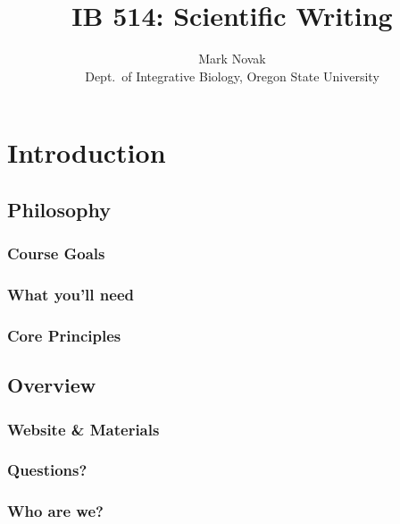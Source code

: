 \documentclass[12pt]{article}
\title{\textbf{IB 514: Scientific Writing}}
\author{Mark Novak \\
  \small Dept.\ of Integrative Biology, Oregon State University}
\date{}
\begin{document}
\maketitle
\thispagestyle{empty}

\tableofcontents


\section{Introduction}
\subsection{Philosophy}
\subsubsection{Course Goals}
\subsubsection{What you'll need}
\subsubsection{Core Principles}
\subsection{Overview}
\subsubsection{Website \& Materials}
\subsubsection{Questions?}
\subsubsection{Who are we?}
\end{document}
